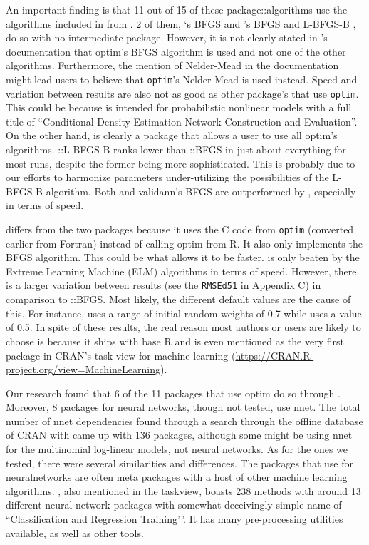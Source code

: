 An important finding is that 11 out of 15 of these package::algorithms
use the algorithms included in  from . 2 of
them, `s BFGS \citep{R-CaDENCE} and
's BFGS and L-BFGS-B \citep{R-validann}, do so with no
intermediate package. However, it is not clearly stated in
's documentation that optim's BFGS algorithm is used
and not one of the other algorithms. Furthermore, the mention of
Nelder-Mead in the documentation might lead users to believe that
\texttt{optim}'s Nelder-Mead is used instead. Speed and variation
between results are also not as good as other package's that use
\texttt{optim}. This could be because  is intended for
probabilistic nonlinear models with a full title of ``Conditional
Density Estimation Network Construction and Evaluation''. On the other
hand,  is clearly a package that allows a user to use
all optim's algorithms. ::L-BFGS-B ranks lower than
::BFGS in just about everything for most runs, despite
the former being more sophisticated. This is probably due to our efforts
to harmonize parameters under-utilizing the possibilities of the
L-BFGS-B algorithm. Both  and validann's BFGS are
outperformed by , especially in terms of speed.

 \citep{R-nnet} differs from the two packages because it
uses the C code from \texttt{optim} (converted earlier from Fortran)
instead of calling optim from R. It also only implements the BFGS
algorithm. This could be what allows it to be faster.  is
only beaten by the Extreme Learning Machine (ELM) algorithms in terms of
speed. However, there is a larger variation between results (see the
\texttt{RMSEd51} in Appendix C) in comparison to
::BFGS. Most likely, the different default values are
the cause of this. For instance,  uses a range of initial
random weights of 0.7 while  uses a value of 0.5. In
spite of these results, the real reason most authors or users are likely
to choose  is because it ships with base R and is even
mentioned as the very first package in CRAN's task view for machine
learning (\url{https://CRAN.R-project.org/view=MachineLearning}).

Our research found that 6 of the 11 packages that use optim do so
through . Moreover, 8 packages for neural networks, though
not tested, use nnet. The total number of nnet dependencies found
through a search through the offline database of CRAN with
 came up with 136 packages, although some might be
using nnet for the multinomial log-linear models, not neural networks.
As for the ones we tested, there were several similarities and
differences. The packages that use  for neuralnetworks are
often meta packages with a host of other machine learning algorithms.
 \citep{R-caret}, also mentioned in the taskview, boasts
238 methods with around 13 different neural network packages with
somewhat deceivingly simple name of ``Classification and Regression
Training'\,'. It has many pre-processing utilities available, as well as
other tools.

